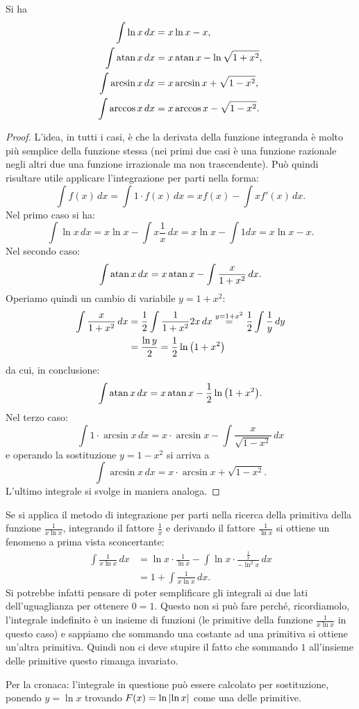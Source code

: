 \begin{theorem}
\mymark{***}
Si ha
\begin{align*}
  \int \ln x\, dx  &= x \ln x - x, \\
  \int \operatorname{atan} x\, dx &= x \operatorname{atan} x - \ln \sqrt{1+x^2},\\
  \int \arcsin x\, dx &= x \arcsin x + \sqrt{1-x^2},\\
  \int \arccos x\, dx &= x \arccos x - \sqrt{1-x^2}.
\end{align*}
\end{theorem}
%
\begin{proof}
\mymark{***}
L'idea, in tutti i casi, è che la derivata della funzione integranda
è molto più semplice della funzione stessa (nei primi due casi è una funzione 
razionale negli altri due una funzione irrazionale ma non trascendente).
Può quindi risultare utile applicare l'integrazione
per parti nella forma:
\[
  \int f(x)\, dx = \int 1\cdot f(x)\, dx = x f(x) - \int x f'(x)\, dx.
\]
Nel primo caso si ha:
\[
\int \ln x\, dx = x \ln x - \int x \frac{1}{x}\, dx
 = x \ln x - \int 1 dx = x \ln x - x.
\]
Nel secondo caso:
\[
\int \operatorname{atan} x\, dx = x \operatorname{atan} x - \int \frac{x}{1+x^2}\, dx.
\]
Operiamo quindi un cambio di variabile $y=1+x^2$:
\begin{align*}
\int \frac{x}{1+x^2}\, dx
&= \frac{1}{2}\int \frac{1}{1+x^2} 2x \, dx
\stackrel{y=1+x^2} = \frac{1}{2}\int \frac 1 y\, dy \\
&= \frac{\ln y}{2} = \frac{1}{2}\ln{\left( 1+x^2 \right)}
\end{align*}
da cui, in conclusione:
\[
 \int \operatorname{atan} x\, dx = x \operatorname{atan} x - \frac 1 2 \ln{\left( 1+x^2 \right)}.
\]
Nel terzo caso:
\[
 \int 1\cdot \arcsin x\, dx = x\cdot \arcsin x - \int\frac{x}{\sqrt{1-x^2}}\, dx  
\]
e operando la sostituzione $y=1-x^2$ si arriva a 
\[
  \int \arcsin x\, dx = x \cdot \arcsin x + \sqrt{1-x^2}.  
\]
L'ultimo integrale si svolge in maniera analoga.
\end{proof}

\begin{remark}
Se si applica il metodo di integrazione per parti nella ricerca della primitiva
della funzione $\frac{1}{x\ln x}$, integrando il fattore $\frac 1 x$ e
derivando il fattore $\frac 1 {\ln x}$ si ottiene un fenomeno a prima vista
sconcertante:
\begin{align*}
  \int \frac{1}{x\ln x}\,dx
  &= \ln x \cdot \frac{1}{\ln x} - \int \ln x \cdot \frac{\frac 1 x}{-\ln^2 x}\, dx\\
  &= 1 + \int \frac{1}{x\ln x}\, dx.
\end{align*}
Si potrebbe infatti pensare di poter semplificare gli integrali ai due lati
dell'uguaglianza per ottenere $0=1$.
Questo non si può fare perché, ricordiamolo, l'integrale indefinito è un insieme
di funzioni (le primitive della funzione $\frac{1}{x\ln x}$ in questo caso)
e sappiamo che sommando una costante ad una primitiva si ottiene un'altra primitiva.
Quindi non ci deve stupire il fatto che sommando $1$ all'insieme delle primitive
questo rimanga invariato.

Per la cronaca: l'integrale in questione può essere calcolato per sostituzione,
ponendo $y=\ln x$ trovando $F(x) = \ln{\left|\ln x\right|}$ come una delle primitive.
\end{remark}
%
%
%
